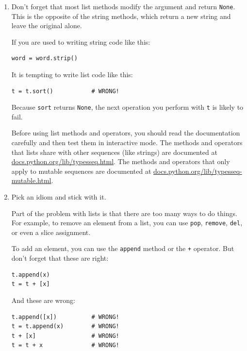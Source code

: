\documentclass[10pt]{book}
\begin{document}
\begin{enumerate}

\item Don't forget that most list methods modify the argument and
  return {\tt None}.  This is the opposite of the string methods,
  which return a new string and leave the original alone.

If you are used to writing string code like this:

\beforeverb
\begin{verbatim}
word = word.strip()
\end{verbatim}
\afterverb

It is tempting to write list code like this:

\beforeverb
\begin{verbatim}
t = t.sort()           # WRONG!
\end{verbatim}
\afterverb


Because {\tt sort} returns {\tt None}, the
next operation you perform with {\tt t} is likely to fail.

Before using list methods and operators, you should read the
documentation carefully and then test them in interactive mode.  The
methods and operators that lists share with other sequences (like
strings) are documented at
\url{docs.python.org/lib/typesseq.html}.  The
methods and operators that only apply to mutable sequences
are documented at \url{docs.python.org/lib/typesseq-mutable.html}.


\item Pick an idiom and stick with it.

Part of the problem with lists is that there are too many
ways to do things.  For example, to remove an element from
a list, you can use {\tt pop}, {\tt remove}, {\tt del},
or even a slice assignment.

To add an element, you can use the {\tt append} method or
the {\tt +} operator.  But don't forget that these are right: 

\beforeverb
\begin{verbatim}
t.append(x)
t = t + [x]
\end{verbatim}
\afterverb

And these are wrong:

\beforeverb
\begin{verbatim}
t.append([x])          # WRONG!
t = t.append(x)        # WRONG!
t + [x]                # WRONG!
t = t + x              # WRONG!
\end{verbatim}
\afterverb


\end{enumerate}
\end{document}
